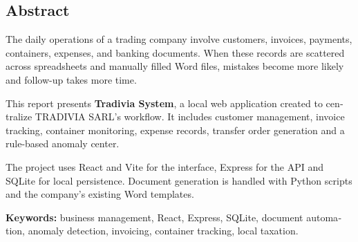 \documentclass[12pt,a4paper,oneside]{report}
\newcommand{\Entreprise}{TRADIVIA SARL}
\begin{document}
\begin{otherlanguage}{english}
\chapter*{Abstract}
The daily operations of a trading company involve customers, invoices, payments, containers, expenses, and banking documents. When these records are scattered across spreadsheets and manually filled Word files, mistakes become more likely and follow-up takes more time.

This report presents \textbf{Tradivia System}, a local web application created to centralize \Entreprise's workflow. It includes customer management, invoice tracking, container monitoring, expense records, transfer order generation and a rule-based anomaly center.

The project uses React and Vite for the interface, Express for the API and SQLite for local persistence. Document generation is handled with Python scripts and the company's existing Word templates.

\textbf{Keywords:} business management, React, Express, SQLite, document automation, anomaly detection, invoicing, container tracking, local taxation.
\end{otherlanguage}

\end{document}
